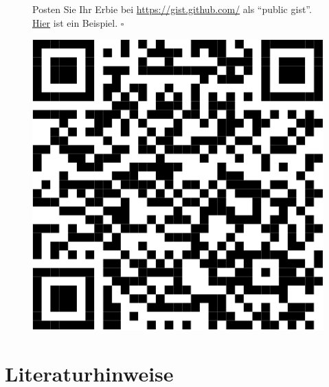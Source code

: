 \documentclass[
  letterpaper,
  twoside,
  open=any]{scrbook}
\theoremstyle{definition}
\theoremstyle{definition}
\theoremstyle{definition}
\theoremstyle{remark}
\begin{document}
\begin{tcolorbox}[enhanced jigsaw, colbacktitle=quarto-callout-tip-color!10!white, colframe=quarto-callout-tip-color-frame, coltitle=black, arc=.35mm, breakable, opacitybacktitle=0.6, toprule=.15mm, colback=white, rightrule=.15mm, opacityback=0, toptitle=1mm, title=\textcolor{quarto-callout-tip-color}{\faLightbulb}\hspace{0.5em}{Tipp}, titlerule=0mm, bottomtitle=1mm, bottomrule=.15mm, leftrule=.75mm, left=2mm]

\begin{figure}[H]

\begin{minipage}{0.80\linewidth}
Posten Sie Ihr Erbie bei \url{https://gist.github.com/} als
\enquote{public gist}.
\href{https://gist.github.com/sebastiansauer/0649a0453b5cc7c6a1d16ac760667215}{Hier}
ist ein Beispiel. \(\square\)\end{minipage}%
%
\begin{minipage}{0.20\linewidth}

\begin{center}
\includegraphics[width=0.75\linewidth,height=\textheight,keepaspectratio]{030-aufbereiten_files/figure-pdf/unnamed-chunk-49-1.pdf}
\end{center}

\end{minipage}%

\end{figure}%

\end{tcolorbox}

\section{Literaturhinweise}\label{literaturhinweise-2}
\end{document}
